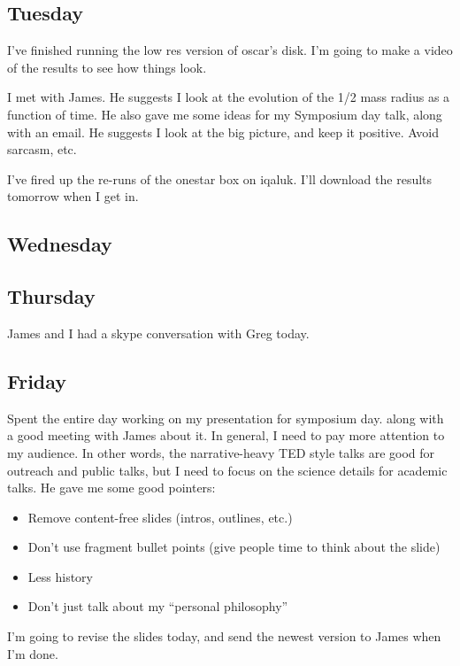 \documentclass[11pt,letterpaper]{article}
\begin{document}
\subsection{Tuesday}

I've finished running the low res version of oscar's disk. I'm going to
make a video of the results to see how things look.

I met with James. He suggests I look at the evolution of the 1/2 mass
radius as a function of time. He also gave me some ideas for my
Symposium day talk, along with an email. He suggests I look at the big
picture, and keep it positive. Avoid sarcasm, etc.

I've fired up the re-runs of the onestar box on iqaluk. I'll download
the results tomorrow when I get in.

\subsection{Wednesday}

\subsection{Thursday}

James and I had a skype conversation with Greg today.

\subsection{Friday}

Spent the entire day working on my presentation for symposium day. along
with a good meeting with James about it. In general, I need to pay more
attention to my audience. In other words, the narrative-heavy TED style
talks are good for outreach and public talks, but I need to focus on the
science details for academic talks. He gave me some good pointers:

\begin{itemize}
\item
  Remove content-free slides (intros, outlines, etc.)
\item
  Don't use fragment bullet points (give people time to think about the
  slide)
\item
  Less history
\item
  Don't just talk about my ``personal philosophy''
\end{itemize}

I'm going to revise the slides today, and send the newest version to
James when I'm done.
\end{document}

